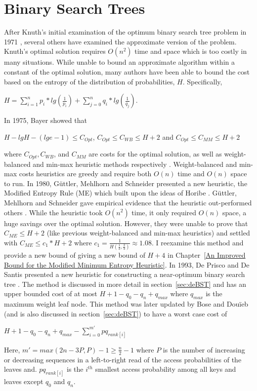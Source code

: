 \documentclass[letterpaper,12pt,titlepage,oneside,final]{book}
\theoremstyle{plain}
\begin{document}
\section{Binary Search Trees}

After Knuth's initial examination of the optimum binary search tree problem in 1971 \cite{knuth1971optimum}, several others have examined the approximate version of the problem. Knuth's optimal solution requires $O(n^2)$ time and space which is too costly in many situations. While unable to bound an approximate algorithm within a constant of the optimal solution, many authors have been able to bound the cost based on the entropy of the distribution of probabilities, $H$. Specifically, 
\begin{center}
$H = \sum_{i=1}^{n} p_i*lg(\frac{1}{p_i}) + \sum_{j=0}^{n} q_i*lg(\frac{1}{q_j})$.
\end{center}
In 1975, Bayer showed that 
\begin{center}
$H-lg H-(lg e-1) \leq C_{Opt}$, $C_{Opt} \leq C_{WB} \leq H + 2$ and $C_{Opt} \leq C_{MM} \leq H + 2$
\end{center}
where $C_{Opt}, C_{WB}$, and $C_{MM}$ are costs for the optimal solution, as well as weight-balanced and min-max heuristic methods respectively \cite{bayer1975improved}. Weight-balanced and min-max costs heuristics are greedy and require both $O(n)$ time and $O(n)$ space to run. In 1980, G{\"u}ttler, Mehlhorn and Schneider presented a new heuristic, the Modified Entropy Rule (ME) \cite{guttler1980binary} which built upon the ideas of Horibe \cite{horibe1977improved}. G{\"u}ttler, Mehlhorn and Schneider gave empirical evidence that the heuristic out-performed others \cite{guttler1980binary}. While the heuristic took $O(n^2)$ time, it only required $O(n)$ space, a huge savings over the optimal solution. However, they were unable to prove that $C_{ME} \leq H+2$ (like previous weight-balanced and min-max heuristics) and settled with $C_{ME} \leq c_1*H+2$ where $c_1=\frac{1}{H(\frac{1}{3}, \frac{2}{3})} \approx 1.08$. I reexamine this method and provide a new bound of giving a new bound of $H+4$ in Chapter~\ref{An Improved Bound for the Modified Minimum Entropy Heuristic}. In 1993, De Prisco and De Santis presented a new heuristic for constructing a near-optimum binary search tree \cite{de1993binary}. The method is discussed in more detail in section~\ref{sec:deBST} and has an upper bounded cost of at most $H+1-q_0-q_n+q_{max}$ where $q_{max}$ is the maximum weight leaf node. This method was later updated by Bose and Dou\"{i}eb (and is also discussed in section~\ref{sec:deBST}) to have a worst case cost of 
\begin{center}
$H + 1 - q_0 - q_n + q_{max} - \sum_{i=0}^{m'} pq_{rank[i]}$
\end{center}
Here, $m'=max({2n-3P,P})-1 \geq \frac{n}{2} - 1$ where $P$ is the number of increasing or decreasing sequences in a left-to-right read of the access probabilities of the leaves and.  $pq_{rank[i]}$ is the $i^{th}$ smallest access probability among all keys and leaves except $q_0$ and $q_n$.
\end{document}
